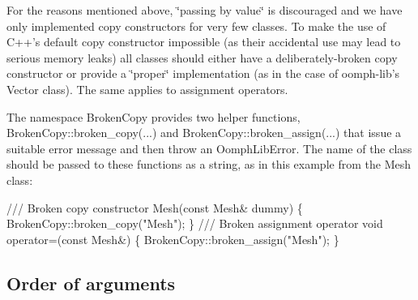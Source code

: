\begin{DoxyItemize}
\item For the reasons mentioned above, \char`\"{}passing by value\char`\"{} is discouraged and we have only implemented copy constructors for very few classes. To make the use of C++'s default copy constructor impossible (as their accidental use may lead to serious memory leaks) all classes should either have a deliberately-\/broken copy constructor or provide a \char`\"{}proper\char`\"{} implementation (as in the case of {\ttfamily oomph-\/lib's} {\ttfamily Vector} class). The same applies to assignment operators. \par
 \par
 The namespace {\ttfamily Broken\-Copy} provides two helper functions, {\ttfamily Broken\-Copy\-::broken\-\_\-copy}(...) and {\ttfamily Broken\-Copy\-::broken\-\_\-assign}(...) that issue a suitable error message and then throw an {\ttfamily Oomph\-Lib\-Error}. The name of the class should be passed to these functions as a string, as in this example from the {\ttfamily Mesh} class\-: \par
\par
 
\begin{DoxyCode}
\textcolor{comment}{/// Broken copy constructor}
\textcolor{comment}{}Mesh(\textcolor{keyword}{const} Mesh& dummy) 
 \{ 
  BrokenCopy::broken\_copy(\textcolor{stringliteral}{"Mesh"});
 \} 
\textcolor{comment}{}
\textcolor{comment}{/// Broken assignment operator}
\textcolor{comment}{}\textcolor{keywordtype}{void} operator=(\textcolor{keyword}{const} Mesh&) 
 \{
  BrokenCopy::broken\_assign(\textcolor{stringliteral}{"Mesh"});
 \}
\end{DoxyCode}

\end{DoxyItemize}\hypertarget{index_order_of_args}{}\subsection{Order of arguments}\label{index_order_of_args}

